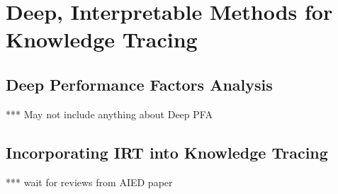 \chapter{Deep, Interpretable Methods for Knowledge Tracing} \label{ch:kt_methods}


\section{Deep Performance Factors Analysis}
*** May not include anything about Deep PFA

\section{Incorporating IRT into Knowledge Tracing}
*** wait for reviews from AIED paper


